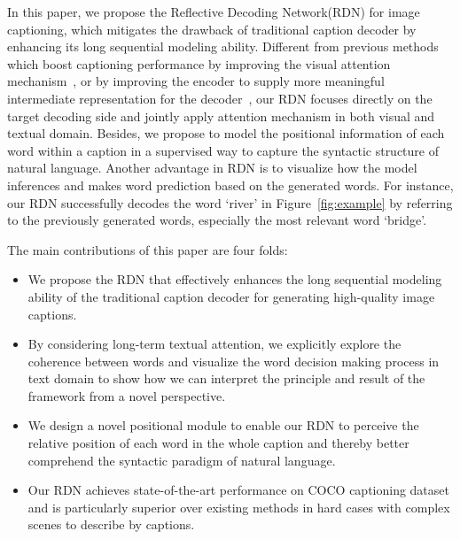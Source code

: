 \documentclass[10pt,twocolumn,letterpaper]{article}
\newcommand{\mymodel}{Reflective Decoding Network\xspace}
\begin{document}
In this paper, we propose the \mymodel(RDN) for image captioning, which mitigates the drawback of traditional caption decoder by enhancing its long sequential modeling ability.
Different from previous methods which boost captioning performance by improving the visual attention mechanism~\cite{anderson2017bottom,lu2017knowing,xu2015showattendtell}, or by improving the encoder to supply more meaningful intermediate representation for the decoder~\cite{jiang2018recurrent,yang2016review,yao2018exploring,you2016image}, our RDN focuses directly on the target decoding side and jointly apply attention mechanism in both visual and textual domain.
Besides, we propose to model the positional information of each word within a caption in a supervised way to capture the syntactic structure of natural language.
Another advantage in RDN is to visualize how the model inferences and makes word prediction based on the generated words.
For instance, our RDN successfully decodes the word `river' in Figure~\ref{fig:example} by referring to the previously generated words, especially the most relevant word `bridge'.


The main contributions of this paper are four folds:
\vspace{-0.05in}
\begin{itemize}
	\item We propose the RDN that effectively enhances the long sequential modeling ability of the traditional caption decoder for generating high-quality image captions.
\vspace{-0.07in}
	\item By considering long-term textual attention, we explicitly explore the coherence between words and visualize the word decision making process in text domain to show how we can interpret the principle and result of the framework from a novel perspective. 
	\vspace{-0.07in}
	\item We design a novel positional module to enable our RDN to perceive the relative position of each word in the whole caption and thereby better comprehend the syntactic paradigm of natural language.
	\vspace{-0.07in}
\item Our RDN achieves state-of-the-art performance on COCO captioning dataset and is particularly superior over existing methods in hard cases with complex scenes to describe by captions.
\end{itemize}
\vspace{-0.05in} \vspace{-2mm}
\end{document}
